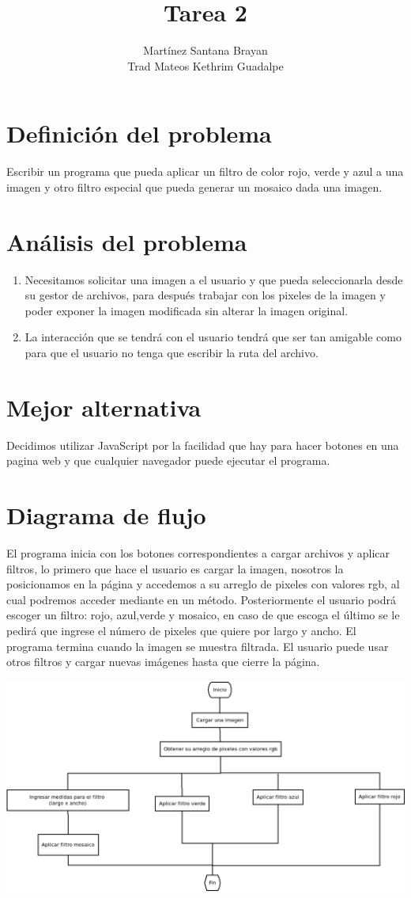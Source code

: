 \documentclass{article}
\title{Tarea 2}
\author{Martínez Santana Brayan\\
Trad Mateos Kethrim Guadalpe
}
\begin{document}
\maketitle
\section{Definición del problema}
Escribir un programa que pueda aplicar un filtro de color rojo, verde y azul a una imagen y otro filtro especial que pueda generar un mosaico dada una imagen.

\section{Análisis del problema}
\begin{enumerate}
    \item Necesitamos solicitar una imagen a el usuario y que pueda seleccionarla desde su gestor de archivos, para después trabajar con los pixeles de la imagen y poder exponer la imagen modificada sin alterar la imagen original.
    \item La interacción que se tendrá con el usuario tendrá que ser tan amigable como para que el usuario no tenga que escribir la ruta del archivo.
\end{enumerate}
\section{Mejor alternativa} Decidimos utilizar JavaScript por la facilidad que hay para hacer botones en una pagina web y que cualquier navegador puede ejecutar el programa.

\section{Diagrama de flujo} El programa inicia con los botones correspondientes a cargar archivos y aplicar filtros, lo primero que hace el usuario es cargar la imagen, nosotros la posicionamos en la página y accedemos a su arreglo de pixeles con valores rgb, al cual podremos acceder mediante en un método. Posteriormente el usuario podrá escoger un filtro: rojo, azul,verde y mosaico, en caso de que escoga el último se le pedirá que ingrese el número de pixeles que quiere por largo y ancho. El programa termina cuando la imagen se muestra filtrada. El usuario puede usar otros filtros y cargar nuevas imágenes hasta que cierre la página.
	\begin{center}
		\includegraphics[width=\linewidth]{DiagramaDeFlujo}
	\end{center}
\end{document}
